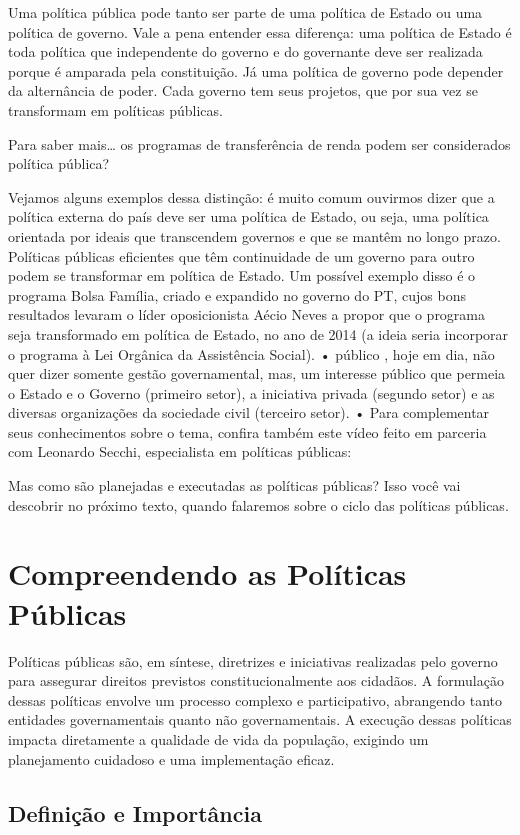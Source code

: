 \documentclass[
   article,       
   12pt,          
   oneside,       
   a4paper,       
   english,       
   brazil,        
   sumario=tradicional
   ]{abntex2}
\begin{document}
Uma política pública pode tanto ser parte de uma política de Estado ou uma política de governo. Vale a pena entender essa diferença: uma política de Estado é toda política que independente do governo e do governante deve ser realizada porque é amparada pela constituição. Já uma política de governo pode depender da alternância de poder. Cada governo tem seus projetos, que por sua vez se transformam em políticas públicas.

Para saber mais… os programas de transferência de renda podem ser considerados política pública?

Vejamos alguns exemplos dessa distinção: é muito comum ouvirmos dizer que a política externa do país deve ser uma política de Estado, ou seja, uma política orientada por ideais que transcendem governos e que se mantêm no longo prazo. Políticas públicas eficientes que têm continuidade de um governo para outro podem se transformar em política de Estado. Um possível exemplo disso é o programa Bolsa Família, criado e expandido no governo do PT, cujos bons resultados levaram o líder oposicionista Aécio Neves a propor que o programa seja transformado em política de Estado, no ano de 2014 (a ideia seria incorporar o programa à Lei Orgânica da Assistência Social).
• público , hoje em dia, não quer dizer somente gestão governamental, mas, um interesse público que permeia o Estado e o Governo (primeiro setor), a iniciativa privada (segundo setor) e as diversas organizações da sociedade civil (terceiro setor).
• Para complementar seus conhecimentos sobre o tema, confira também este vídeo feito em parceria com Leonardo Secchi, especialista em políticas públicas:

Mas como são planejadas e executadas as políticas públicas? Isso você vai descobrir no próximo texto, quando falaremos sobre o ciclo das políticas públicas. \section{Compreendendo as Políticas Públicas}

Políticas públicas são, em síntese, diretrizes e iniciativas realizadas pelo governo para assegurar direitos previstos constitucionalmente aos cidadãos. A formulação dessas políticas envolve um processo complexo e participativo, abrangendo tanto entidades governamentais quanto não governamentais. A execução dessas políticas impacta diretamente a qualidade de vida da população, exigindo um planejamento cuidadoso e uma implementação eficaz.

\subsection{Definição e Importância}
\end{document}
